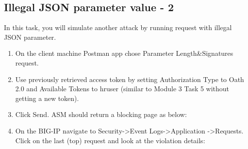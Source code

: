 \documentclass[letterpaper,10pt,english]{sphinxmanual}
\begin{document}
\subsection{Illegal JSON parameter value - 2}
\label{\detokenize{class1/module4/module4:illegal-json-parameter-value-2}}
In this task, you will simulate another attack by running request with
illegal JSON parameter.
\begin{enumerate}
\item {} 
On the client machine Postman app chose Parameter Length\&Signatures
request.

\item {} 
Use previously retrieved access token by setting Authorization Type
to Oath 2.0 and Available Tokens to hruser (similar to Module 3 Task
5 without getting a new token).

\item {} 
Click Send. ASM should return a blocking page as below:

\end{enumerate}
\begin{quote}

\noindent{}
\end{quote}
\begin{enumerate}
\setcounter{enumi}{3}
\item {} 
On the BIG-IP navigate to Security-\textgreater{}Event Logs-\textgreater{}Application
-\textgreater{}Requests. Click on the last (top) request and look at the violation
details:

\end{enumerate}
\begin{quote}

\noindent{}
\end{quote}
\end{document}
